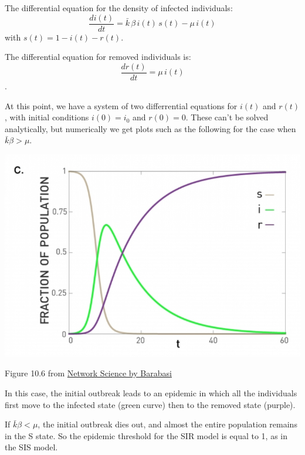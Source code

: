 \documentclass[11pt]{scrartcl} %
\begin{document}
The differential equation for the density of infected individuals:
\[ \frac{di(t)}{dt} = \bar{k} \, \beta \, i(t) \, s(t) - \mu\, i(t) \]
with $s(t) = 1 - i(t) - r(t) $.

The differential equation for removed individuals is:
\[ \frac{dr(t)}{dt} = \mu\, i(t) \].

At this point, we have a system of two differrential equations for $i(t)$ and $r(t)$, with initial conditions $i(0)=i_0$ and $r(0)=0$. These can't be solved analytically, but numerically we get plots such as the following for the case when $\bar{k}\beta > \mu$.

\begin{center}
\includegraphics[width=0.75\linewidth]{img/L9.3_SIRmodel.png}

{\tiny Figure 10.6 from \href{http://networksciencebook.com/}{Network Science by Barabasi}}
\end{center}

In this case, the initial outbreak leads to an epidemic in which all the individuals first move to the infected state (green curve) then to the removed state (purple).

If $\bar{k}\beta < \mu$, the initial outbreak dies out, and almost the entire population remains in the S state. So the epidemic threshold for the SIR model is equal to 1, as in the SIS model.
\end{document}
